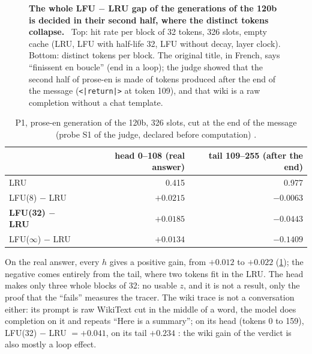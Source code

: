 \begin{figure}[tbp]
\centering
{}
\caption[P1: hit rate per block of the two generations of the 120b]{\textbf{The whole LFU $-$ LRU gap of the generations of the 120b is decided in their second half, where the distinct tokens collapse.} \mes~Top: hit rate per block of 32 tokens, 326 slots, empty cache (LRU, LFU with half-life 32, LFU without decay, layer clock). Bottom: distinct tokens per block. The original title, in French, says ``finissent en boucle'' (end in a loop); the judge showed that the second half of prose-en is made of tokens produced after the end of the message (\texttt{<|return|>} at token 109), and that wiki is a raw completion without a chat template. \HorsStyle{}}
\label{fig:t3-mim-p1-blocs}
\end{figure}

\begin{table}[tbp]
\centering\small
\caption[P1: the real answer against the tokens after the end]{P1, prose-en generation of the 120b, 326 slots, cut at the end of the message (probe S1 of the judge, declared before computation) \mes.}
\label{t3mim:tab:p1-tete}
\begin{tabular}{@{}lrr@{}}
\toprule
& head 0--108 (real answer) & tail 109--255 (after the end) \\
\midrule
LRU & 0.415 & 0.977 \\
LFU(8) $-$ LRU & $+0.0215$ & $-0.0063$ \\
\textbf{LFU(32) $-$ LRU} & $\mathbf{+0.0185}$ & $-0.0443$ \\
LFU($\infty$) $-$ LRU & $+0.0134$ & $-0.1409$ \\
\bottomrule
\end{tabular}
\end{table}

On the real answer, every $h$ gives a positive gain, from $+0.012$ to $+0.022$ (\cref{t3mim:tab:p1-tete}); the negative comes entirely from the tail, where two tokens fit in the LRU. The head makes only three whole blocks of 32: no usable $z$, and it is not a result, only the proof that the ``fails'' measures the tracer. The wiki trace is not a conversation either: its prompt is raw WikiText cut in the middle of a word, the model does completion on it and repeats ``Here is a summary''; on its head (tokens 0 to 159), LFU(32) $-$ LRU $= +0.041$, on its tail $+0.234$ \mes: the wiki gain of the verdict is also mostly a loop effect.

